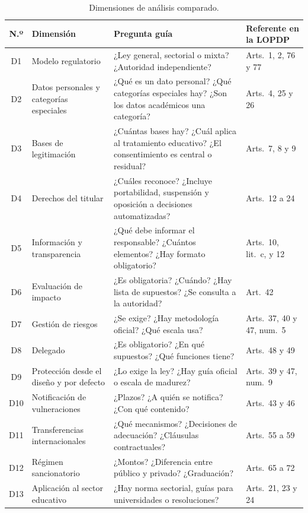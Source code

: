 \begin{table}[htbp]
  \centering
  \caption{Dimensiones de análisis comparado.}
  \label{tab:dimensiones}
  \scriptsize
  \renewcommand{\arraystretch}{1.12}
  \begin{tabularx}{\textwidth}{|c|>{\raggedright\arraybackslash}p{3.3cm}|L|>{\raggedright\arraybackslash}p{2.7cm}|}
    \hline
    \textbf{N.º} & \textbf{Dimensión} & \textbf{Pregunta guía} & \textbf{Referente en la LOPDP} \\
    \hline
    D1 & Modelo regulatorio & ¿Ley general, sectorial o mixta? ¿Autoridad independiente? & Arts.~1, 2, 76 y 77 \\ \hline
    D2 & Datos personales y categorías especiales & ¿Qué es un dato personal? ¿Qué categorías especiales hay? ¿Son los datos académicos una categoría? & Arts.~4, 25 y 26 \\ \hline
    D3 & Bases de legitimación & ¿Cuántas bases hay? ¿Cuál aplica al tratamiento educativo? ¿El consentimiento es central o residual? & Arts.~7, 8 y 9 \\ \hline
    D4 & Derechos del titular & ¿Cuáles reconoce? ¿Incluye portabilidad, suspensión y oposición a decisiones automatizadas? & Arts.~12 a 24 \\ \hline
    D5 & Información y transparencia & ¿Qué debe informar el responsable? ¿Cuántos elementos? ¿Hay formato obligatorio? & Arts.~10, lit.~c, y 12 \\ \hline
    D6 & Evaluación de impacto & ¿Es obligatoria? ¿Cuándo? ¿Hay lista de supuestos? ¿Se consulta a la autoridad? & Art.~42 \\ \hline
    D7 & Gestión de riesgos & ¿Se exige? ¿Hay metodología oficial? ¿Qué escala usa? & Arts.~37, 40 y 47, num.~5 \\ \hline
    D8 & Delegado & ¿Es obligatorio? ¿En qué supuestos? ¿Qué funciones tiene? & Arts.~48 y 49 \\ \hline
    D9 & Protección desde el diseño y por defecto & ¿Lo exige la ley? ¿Hay guía oficial o escala de madurez? & Arts.~39 y 47, num.~9 \\ \hline
    D10 & Notificación de vulneraciones & ¿Plazos? ¿A quién se notifica? ¿Con qué contenido? & Arts.~43 y 46 \\ \hline
    D11 & Transferencias internacionales & ¿Qué mecanismos? ¿Decisiones de adecuación? ¿Cláusulas contractuales? & Arts.~55 a 59 \\ \hline
    D12 & Régimen sancionatorio & ¿Montos? ¿Diferencia entre público y privado? ¿Graduación? & Arts.~65 a 72 \\ \hline
    D13 & Aplicación al sector educativo & ¿Hay norma sectorial, guías para universidades o resoluciones? & Arts.~21, 23 y 24 \\ \hline
  \end{tabularx}
  \raggedright
\end{table}


